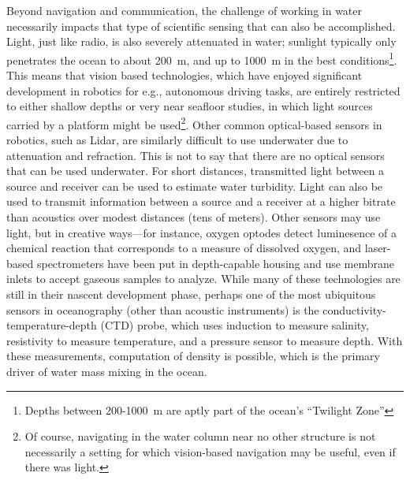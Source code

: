 Beyond navigation and communication, the challenge of working in water necessarily impacts that type of scientific sensing that can also be accomplished. Light, just like radio, is also severely attenuated in water; sunlight typically only penetrates the ocean to about \SI{200}{\meter}, and up to \SI{1000}{\meter} in the best conditions\footnote{Depths between 200-\SI{1000}{\meter} are aptly part of the ocean's ``Twilight Zone''\autocite{martin2020oceans}}. This means that vision based technologies, which have enjoyed significant development in robotics for e.g., autonomous driving tasks, are entirely restricted to either shallow depths or very near seafloor studies, in which light sources carried by a platform might be used\footnote{Of course, navigating in the water column near no other structure is not necessarily a setting for which vision-based navigation may be useful, even if there was light.}. Other common optical-based sensors in robotics, such as Lidar, are similarly difficult to use underwater due to attenuation and refraction. This is not to say that there are no optical sensors that can be used underwater. For short distances, transmitted light between a source and receiver can be used to estimate water turbidity\autocite{bishop1999transmissometer}. Light can also be used to transmit information between a source and a receiver at a higher bitrate than acoustics over modest distances (tens of meters)\autocite{qureshi2016rf,farr2010integrated}. Other sensors may use light, but in creative ways---for instance, oxygen optodes detect luminesence of a chemical reaction that corresponds to a measure of dissolved oxygen\autocite{nicholson2017air}, and laser-based spectrometers have been put in depth-capable housing and use membrane inlets to accept gaseous samples to analyze\autocite{wankel2010new}. While many of these technologies are still in their nascent development phase, perhaps one of the most ubiquitous sensors in oceanography (other than acoustic instruments) is the conductivity-temperature-depth (CTD) probe, which uses induction to measure salinity, resistivity to measure temperature, and a pressure sensor to measure depth\autocite{rudnick2007underway}. With these measurements, computation of density is possible, which is the primary driver of water mass mixing in the ocean. 

